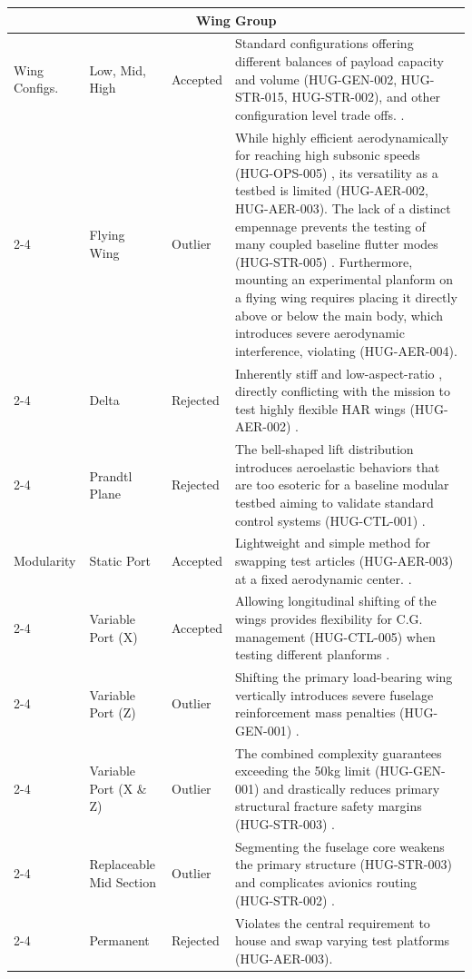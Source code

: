 \begin{longtable}{|p{1.6cm}|p{2.3cm}|p{1.6cm}|p{9.5cm}|}
\multicolumn{4}{|c|}{\textbf{Wing Group}} \\
\hline
Wing Configs. & Low, Mid, High & Accepted & Standard configurations offering different balances of payload capacity and volume (HUG-GEN-002, HUG-STR-015, HUG-STR-002), and other configuration level trade offs.  \cite{raymer1992aircraft}. \\
\cline{2-4}
\multicolumn{1}{|l|}{} & Flying Wing & Outlier & While highly efficient aerodynamically for reaching high subsonic speeds (HUG-OPS-005) \cite{raymer1992aircraft}, its versatility as a testbed is limited (HUG-AER-002, HUG-AER-003). The lack of a distinct empennage prevents the testing of many coupled baseline flutter modes (HUG-STR-005) \cite{livne}. Furthermore, mounting an experimental planform on a flying wing requires placing it directly above or below the main body, which introduces severe aerodynamic interference, violating (HUG-AER-004). \\
\cline{2-4}
\multicolumn{1}{|l|}{} & Delta & Rejected & Inherently stiff and low-aspect-ratio \cite{raymer1992aircraft}, directly conflicting with the mission to test highly flexible HAR wings (HUG-AER-002) \cite{Ma2024}. \\
\cline{2-4}
\multicolumn{1}{|l|}{} & Prandtl Plane & Rejected & The bell-shaped lift distribution introduces aeroelastic behaviors that are too esoteric for a baseline modular testbed aiming to validate standard control systems (HUG-CTL-001) \cite{Bowers2016}. \\
\hline
Modularity & Static Port & Accepted & Lightweight and simple method for swapping test articles (HUG-AER-003) at a fixed aerodynamic center. \cite{raymer1992aircraft}. \\
\cline{2-4}
\multicolumn{1}{|l|}{} & Variable Port (X) & Accepted & Allowing longitudinal shifting of the wings provides flexibility for C.G. management (HUG-CTL-005) when testing different planforms \cite{Vos}. \\
\cline{2-4}
\multicolumn{1}{|l|}{} & Variable Port (Z) & Outlier & Shifting the primary load-bearing wing vertically introduces severe fuselage reinforcement mass penalties (HUG-GEN-001) \cite{raymer1992aircraft}. \\
\cline{2-4}
\multicolumn{1}{|l|}{} & Variable Port (X \& Z) & Outlier & The combined complexity guarantees exceeding the 50kg limit (HUG-GEN-001) and drastically reduces primary structural fracture safety margins (HUG-STR-003) \cite{raymer1992aircraft}. \\
\cline{2-4}
\multicolumn{1}{|l|}{} & Replaceable Mid Section & Outlier & Segmenting the fuselage core weakens the primary structure (HUG-STR-003) and complicates avionics routing (HUG-STR-002) \cite{Airbus_Concurent}. \\
\cline{2-4}
\multicolumn{1}{|l|}{} & Permanent & Rejected & Violates the central requirement to house and swap varying test platforms (HUG-AER-003). \\
\hline


\end{longtable}
